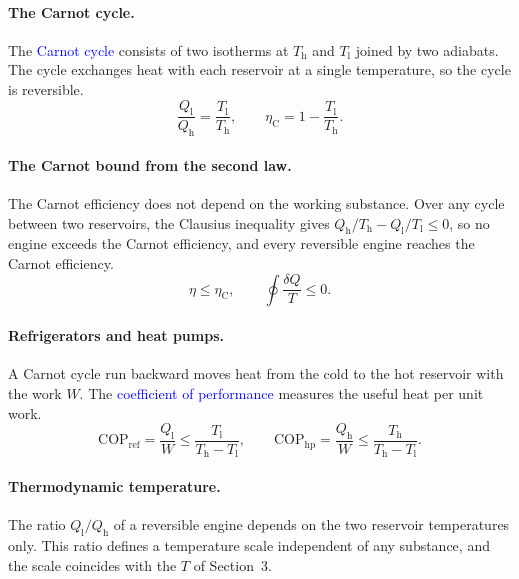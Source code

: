 \paragraph{The Carnot cycle.}
The \textcolor{blue}{Carnot cycle} consists of two isotherms at
$T_{\text{h}}$ and $T_{\text{l}}$ joined by two adiabats. The cycle
exchanges heat with each reservoir at a single temperature, so the cycle is
reversible.
\begin{equation}
    \boxed{\frac{Q_{\text{l}}}{Q_{\text{h}}}=\frac{T_{\text{l}}}{T_{\text{h}}},
    \qquad
    \eta_{\text{C}}=1-\frac{T_{\text{l}}}{T_{\text{h}}}.}
\end{equation}

\paragraph{The Carnot bound from the second law.}
The Carnot efficiency does not depend on the working substance. Over any
cycle between two reservoirs, the Clausius inequality gives
$Q_{\text{h}}/T_{\text{h}}-Q_{\text{l}}/T_{\text{l}}\leq0$, so no engine
exceeds the Carnot efficiency, and every reversible engine reaches the
Carnot efficiency.
\begin{equation}
    \boxed{\eta\leq\eta_{\text{C}},\qquad
    \oint\frac{\delta Q}{T}\leq0.}
\end{equation}

\paragraph{Refrigerators and heat pumps.}
A Carnot cycle run backward moves heat from the cold to the hot reservoir
with the work $W$. The \textcolor{blue}{coefficient of performance} measures
the useful heat per unit work.
\begin{equation}
    \boxed{\mathrm{COP}_{\text{ref}}=\frac{Q_{\text{l}}}{W}\leq\frac{T_{\text{l}}}{T_{\text{h}}-T_{\text{l}}},
    \qquad
    \mathrm{COP}_{\text{hp}}=\frac{Q_{\text{h}}}{W}\leq\frac{T_{\text{h}}}{T_{\text{h}}-T_{\text{l}}}.}
\end{equation}

\paragraph{Thermodynamic temperature.}
The ratio $Q_{\text{l}}/Q_{\text{h}}$ of a reversible engine depends on the
two reservoir temperatures only. This ratio defines a temperature scale
independent of any substance, and the scale coincides with the $T$ of
Section~3.

